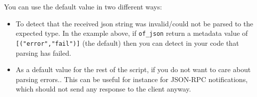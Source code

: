 You can use the default value in two different ways:

\begin{itemize}
\item To detect that the received json string was invalid/could not be parsed to the expected type. In the example above, if \verb+of_json+ return a metadata value of \verb+[("error","fail")]+ (the default) then you can detect in your code that parsing has failed.
\item As a default value for the rest of the script, if you do not want to care about parsing errors.. This can be useful for instance for JSON-RPC notifications, which should not send any response to the client anyway.

\end{itemize}
